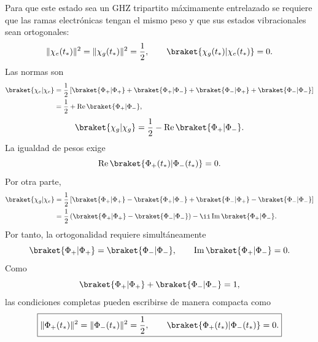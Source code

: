 Para que este estado sea un GHZ tripartito m\'aximamente entrelazado se
requiere que las ramas electr\'onicas tengan el mismo peso y que sus estados
vibracionales sean ortogonales:
\begin{equation}
  \|\chi_e(t_*)\|^2
  =
  \|\chi_g(t_*)\|^2
  =
  \frac12,
  \qquad
  \braket{\chi_g(t_*)|\chi_e(t_*)}=0.
\end{equation}
Las normas son
\begin{equation}
\begin{aligned}
  \braket{\chi_e|\chi_e}
  &={}
  \frac12
  \left[
  \braket{\Phi_+|\Phi_+}
  +\braket{\Phi_+|\Phi_-}
  +\braket{\Phi_-|\Phi_+}
  +\braket{\Phi_-|\Phi_-}
  \right]
  \\
  &=
  \frac12+\operatorname{Re}\braket{\Phi_+|\Phi_-},
\end{aligned}
\end{equation}
\begin{equation}
  \braket{\chi_g|\chi_g}
  =
  \frac12-\operatorname{Re}\braket{\Phi_+|\Phi_-}.
\end{equation}
La igualdad de pesos exige
\begin{equation}
  \operatorname{Re}\braket{\Phi_+(t_*)|\Phi_-(t_*)}=0.
\end{equation}
Por otra parte,
\begin{equation}
\begin{aligned}
  \braket{\chi_g|\chi_e}
  ={}&
  \frac12
  \left[
  \braket{\Phi_+|\Phi_+}
  -\braket{\Phi_+|\Phi_-}
  +\braket{\Phi_-|\Phi_+}
  -\braket{\Phi_-|\Phi_-}
  \right]
  \\
  ={}&
  \frac12
  \left(
  \braket{\Phi_+|\Phi_+}
  -\braket{\Phi_-|\Phi_-}
  \right)
  -\ii\operatorname{Im}\braket{\Phi_+|\Phi_-}.
\end{aligned}
\end{equation}
Por tanto, la ortogonalidad requiere simult\'aneamente
\begin{equation}
  \braket{\Phi_+|\Phi_+}
  =
  \braket{\Phi_-|\Phi_-},
  \qquad
  \operatorname{Im}\braket{\Phi_+|\Phi_-}=0.
\end{equation}
Como
\begin{equation}
  \braket{\Phi_+|\Phi_+}
  +
  \braket{\Phi_-|\Phi_-}=1,
\end{equation}
las condiciones completas pueden escribirse de manera compacta como
\begin{equation}
  \boxed{
  \|\Phi_+(t_*)\|^2
  =
  \|\Phi_-(t_*)\|^2
  =
  \frac12,
  \qquad
  \braket{\Phi_+(t_*)|\Phi_-(t_*)}=0.
  }
\end{equation}

